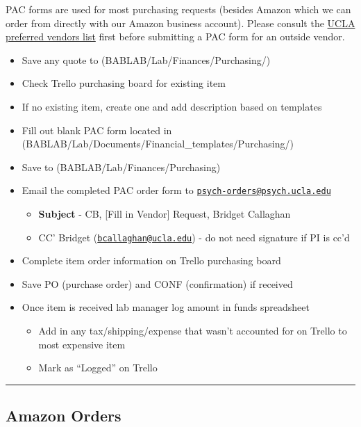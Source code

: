 \documentclass[]{book}
\providecommand{\tightlist}{%
  \setlength{\itemsep}{0pt}\setlength{\parskip}{0pt}}
\begin{document}
PAC forms are used for most purchasing requests (besides Amazon which we can order from directly with our Amazon business account). Please consult the \href{http://staff.purchasing.ucla.edu/Portal/app/agreements/agreementsummary.aspx}{UCLA preferred vendors list} first before submitting a PAC form for an outside vendor.

\begin{itemize}
\tightlist
\item
  Save any quote to (BABLAB/Lab/Finances/Purchasing/)
\item
  Check Trello purchasing board for existing item
\item
  If no existing item, create one and add description based on templates
\item
  Fill out blank PAC form located in (BABLAB/Lab/Documents/Financial\_templates/Purchasing/)
\item
  Save to (BABLAB/Lab/Finances/Purchasing)
\item
  Email the completed PAC order form to \href{mailto:psych-orders@psych.ucla.edu}{\nolinkurl{psych-orders@psych.ucla.edu}}

  \begin{itemize}
  \tightlist
  \item
    \textbf{Subject} - CB, {[}Fill in Vendor{]} Request, Bridget Callaghan
  \item
    CC' Bridget (\href{mailto:bcallaghan@ucla.edu}{\nolinkurl{bcallaghan@ucla.edu}}) - do not need signature if PI is cc'd
  \end{itemize}
\item
  Complete item order information on Trello purchasing board
\item
  Save PO (purchase order) and CONF (confirmation) if received
\item
  Once item is received lab manager log amount in funds spreadsheet

  \begin{itemize}
  \tightlist
  \item
    Add in any tax/shipping/expense that wasn't accounted for on Trello to most expensive item
  \item
    Mark as ``Logged'' on Trello
  \end{itemize}
\end{itemize}

\begin{center}\rule{0.5\linewidth}{0.5pt}\end{center}

\hypertarget{amazon-orders}{%
\subsection{Amazon Orders}\label{amazon-orders}}
\end{document}

